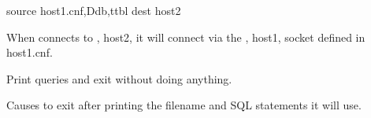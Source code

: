 \documentclass[letterpaper,10pt,english]{sphinxmanual}
\begin{document}
\begin{fulllineitems}
\begin{sphinxVerbatim}[commandchars=\\\{\}]
\PYGZhy{}\PYGZhy{}source host1.cnf,Ddb,ttbl \PYGZhy{}\PYGZhy{}dest host2
\end{sphinxVerbatim}

\sphinxAtStartPar
When  connects to {\hyperref[\detokenize{mariadb-archiver:cmdoption-mariadb-archiver-dest}]{}}, host2, it will connect via the
{\hyperref[\detokenize{mariadb-archiver:cmdoption-mariadb-archiver-source}]{}}, host1, socket defined in host1.cnf.

\end{fulllineitems}


\begin{fulllineitems}
\label{\detokenize{mariadb-archiver:cmdoption-mariadb-archiver-dry-run}}
\sphinxAtStartPar
Print queries and exit without doing anything.

\sphinxAtStartPar
Causes  to exit after printing the filename and SQL statements
it will use.

\end{fulllineitems}

\end{document}
